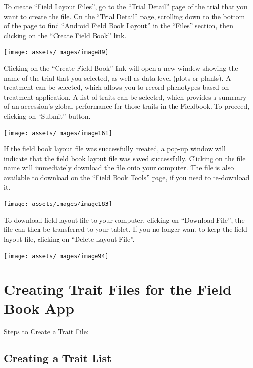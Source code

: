 \documentclass[
  12pt,
]{book}
\begin{document}
To create ``Field Layout Files'', go to the ``Trial Detail'' page of the trial that you want to create the file. On the ``Trial Detail'' page, scrolling down to the bottom of the page to find ``Android Field Book Layout'' in the ``Files'' section, then clicking on the ``Create Field Book'' link.

\begin{center}\texttt{[image: assets/images/image89]} \end{center}

Clicking on the ``Create Field Book'' link will open a new window showing the name of the trial that you selected, as well as data level (plots or plants). A treatment can be selected, which allows you to record phenotypes based on treatment application. A list of traits can be selected, which provides a summary of an accession's global performance for those traits in the Fieldbook. To proceed, clicking on ``Submit'' button.

\begin{center}\texttt{[image: assets/images/image161]} \end{center}

If the field book layout file was successfully created, a pop-up window will indicate that the field book layout file was saved successfully. Clicking on the file name will immediately download the file onto your computer. The file is also available to download on the ``Field Book Tools'' page, if you need to re-download it.

\begin{center}\texttt{[image: assets/images/image183]} \end{center}

To download field layout file to your computer, clicking on ``Download File'', the file can then be transferred to your tablet. If you no longer want to keep the field layout file, clicking on ``Delete Layout File''.

\begin{center}\texttt{[image: assets/images/image94]} \end{center}

\hypertarget{creating-trait-files}{%
\section{Creating Trait Files for the Field Book App}\label{creating-trait-files}}

Steps to Create a Trait File:

\hypertarget{creating-a-trait-list}{%
\subsection{Creating a Trait List}\label{creating-a-trait-list}}
\end{document}
